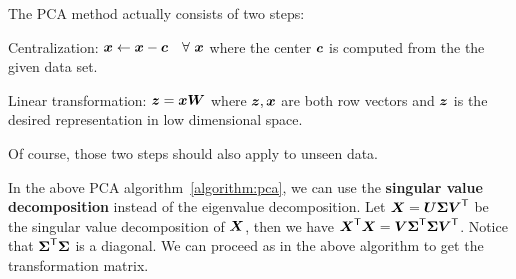 \begin{re}
    The PCA method actually consists of two steps:
    \begin{compactenum}
        \item Centralization: $\boldsymbol{x} \gets \boldsymbol{x} -\boldsymbol{c}\quad\forall~\boldsymbol{x}$ where the center $\boldsymbol{c}$ is computed
        from the the given data set.
        \item Linear transformation: $\boldsymbol{z} = \boldsymbol{x} \boldsymbol{W}$ where $\boldsymbol{z}, \boldsymbol{x}$ are both row vectors and
        $\boldsymbol{z}$ is the desired representation in low dimensional space.
    \end{compactenum}
    Of course, those two steps should also apply to unseen data.
\end{re}

\begin{re}
    In the above PCA algorithm~\ref{algorithm:pca}, we can use the \textbf{singular value decomposition}
    instead of the eigenvalue decomposition. Let $\boldsymbol{X} = \boldsymbol{U}\boldsymbol{\Sigma}{\boldsymbol{V}}^\mathsf{T}$ be the singular value 
    decomposition of $\boldsymbol{X}$, then we have ${\boldsymbol{X}}^\mathsf{T}\boldsymbol{X} = \boldsymbol{V} {\boldsymbol{\Sigma}}^\mathsf{T}\boldsymbol{\Sigma} {\boldsymbol{V}}^\mathsf{T}$. Notice
    that ${\boldsymbol{\Sigma}}^\mathsf{T}\boldsymbol{\Sigma}$ is a diagonal. We can proceed as in the above algorithm to get the
    transformation matrix.
\end{re}

